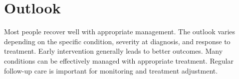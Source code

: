 \section{Outlook}
Most people recover well with appropriate management. The outlook varies depending on the specific condition, severity at diagnosis, and response to treatment. Early intervention generally leads to better outcomes. Many conditions can be effectively managed with appropriate treatment. Regular follow-up care is important for monitoring and treatment adjustment.
